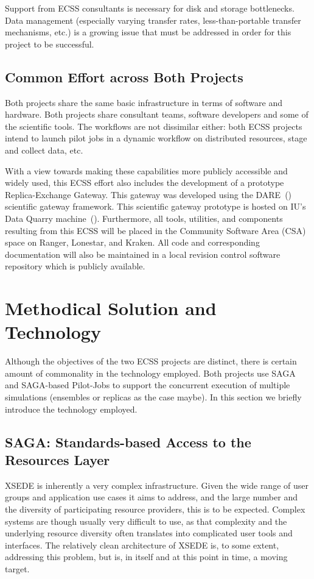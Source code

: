 \documentclass{sig-alternate}
\begin{document}
Support from ECSS consultants is necessary for disk
and storage bottlenecks. Data management (especially varying transfer rates,
less-than-portable transfer mechanisms, etc.) is a growing issue that must be 
addressed in order for this project to be successful.

\subsection{Common Effort across Both Projects}

Both projects share the same basic infrastructure in terms of software and
hardware. Both projects share consultant teams, software developers and some of
the scientific tools. The workflows are not dissimilar either: both ECSS
projects intend to launch pilot jobs in a dynamic workflow on distributed
resources, stage and collect data, etc.

With a view towards making these capabilities more publicly accessible and
widely used, this ECSS effort also includes the development of a prototype
Replica-Exchange Gateway. This gateway was developed using the
DARE~(\cite{DARE})
scientific gateway framework. This scientific gateway prototype is hosted
on IU's Data Quarry machine~(\cite{DataQuarry}). Furthermore, all tools,
utilities, and components resulting from this ECSS will be placed in the Community 
Software Area (CSA) space on Ranger,
Lonestar, and Kraken. All code and corresponding documentation will also be
maintained in a local revision control software repository which is publicly
available.


\section{Methodical Solution and Technology}

Although the objectives of the two ECSS projects are distinct, there
is certain amount of commonality in the technology employed. Both
projects use SAGA and SAGA-based Pilot-Jobs to support the concurrent
execution of multiple simulations (ensembles or replicas as the case
maybe). In this section we briefly introduce the technology employed.

\subsection{SAGA: Standards-based Access to the Resources Layer}
\label{saga}
XSEDE is inherently a very complex infrastructure.  Given the wide
range of user groups and application use cases it aims to address,
and the large number and the diversity of participating resource
providers, this is to be expected.  Complex systems are though
usually very difficult to use, as that complexity and the underlying
resource diversity often translates into complicated user tools and
interfaces.  The relatively clean architecture of XSEDE is, to some
extent, addressing this problem, but is, in itself and at this point
in time, a moving target.
\end{document}
